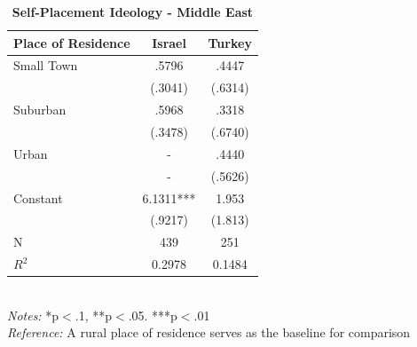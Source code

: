 \documentclass[12pt, titlepage]{article}
\newcommand\e{\emph}
\newcommand\tb{\textbf}
\begin{document}
\begin{singlespace}
	\begin{table}[H]
		\centering
		\caption{\tb{Self-Placement Ideology - Middle East}}
		\begin{tabulary}{\linewidth}{l c c}
			\\
			\hline
			\tb{Place of Residence}&\tb{Israel} & \tb{Turkey} \\
			\hline
			Small Town&.5796 & .4447 \\
			&(.3041)  & (.6314)\\
			Suburban&.5968 &.3318 \\
			& (.3478)  & (.6740)\\
			Urban &- & .4440\\
			&- & (.5626)\\
			Constant& 6.1311*** &1.953 \\
			& (.9217)  & (1.813)\\
			N&439 & 251\\
			$R^2$&0.2978 & 0.1484 \\
			\hline 
		\end{tabulary}
		\\
		\e{Notes:} *p$<$.1, **p$<$.05. ***p$<$.01 \\
		\e{Reference:} A rural place of residence serves as the baseline for comparison
		\label{table10}
	\end{table}
\end{singlespace}
\end{document}
